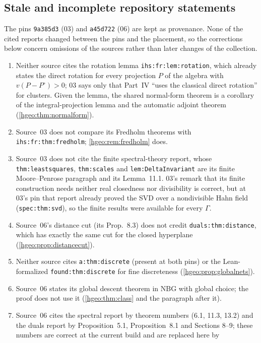 \documentclass[11pt,letterpaper]{article}
\numberwithin{equation}{section}
\theoremstyle{definition}
\theoremstyle{remark}
\newcommand{\replabel}[1]{\nolinkurl{#1}}
\begin{document}
\subsection{Stale and incomplete repository statements}\label{hgeo:app:stale}
The pins \texttt{9a385d3} (03) and \texttt{a45d722} (06) are kept as
provenance. None of the cited reports changed between the pins and the
placement, so the corrections below concern omissions of the sources rather
than later changes of the collection.
\begin{enumerate}[leftmargin=*]
\item Neither source cites the rotation lemma \replabel{ihs:fr:lem:rotation},
which already states the direct rotation for every projection $P$ of the
algebra with $v(P-P^\circ)>0$; 03 says only that Part~IV ``uses the classical
direct rotation'' for clusters. Given the lemma, the shared normal-form
theorem is a corollary of the integral-projection lemma and the automatic
adjoint theorem (\cref{hgeo:thm:normalform}).
\item Source~03 does not compare its Fredholm theorems with
\replabel{ihs:fr:thm:fredholm}; \cref{hgeo:rem:fredholm} does.
\item Source~03 does not cite the finite spectral-theory report, whose
\replabel{thm:leastsquares}, \replabel{thm:scales} and
\replabel{lem:DeltaInvariant} are its finite Moore--Penrose paragraph and its
Lemma~11.1. 03's remark that its finite construction needs neither real
closedness nor divisibility is correct, but at 03's pin that report already
proved the SVD over a nondivisible Hahn field (\replabel{spec:thm:svd}), so
the finite results were available for every $\Gamma$.
\item Source~06's distance cut (its Prop.~8.3) does not credit
\replabel{duals:thm:distance}, which has exactly the same cut for the closed
hyperplane (\cref{hgeo:prop:distancecut}).
\item Neither source cites \replabel{a:thm:discrete} (present at both pins) or
the Lean-formalized \replabel{found:thm:discrete} for fine discreteness
(\cref{hgeo:prop:globalnets}).
\item Source~06 states its global descent theorem in NBG with global choice;
the proof does not use it (\cref{hgeo:thm:class} and the paragraph after
it).
\item Source~06 cites the spectral report by theorem numbers (6.1, 11.3,
13.2) and the duals report by Proposition~5.1, Proposition~8.1 and Sections
8--9; these numbers are correct at the current build and are replaced here by

\end{enumerate}
\end{document}
